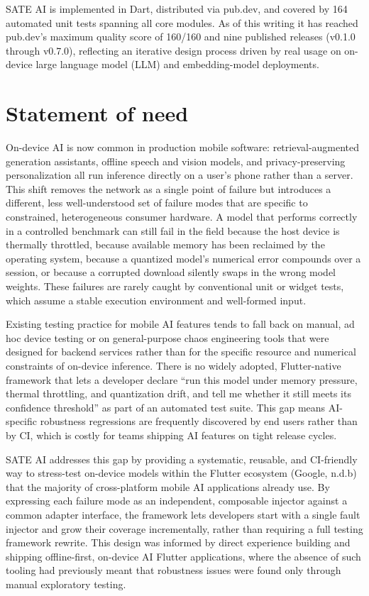 \documentclass[
  11pt,
]{article}
\begin{document}
SATE AI is implemented in Dart, distributed via pub.dev, and covered by
164 automated unit tests spanning all core modules. As of this writing
it has reached pub.dev's maximum quality score of 160/160 and nine
published releases (v0.1.0 through v0.7.0), reflecting an iterative
design process driven by real usage on on-device large language model
(LLM) and embedding-model deployments.

\hypertarget{statement-of-need}{%
\section{Statement of need}\label{statement-of-need}}

On-device AI is now common in production mobile software:
retrieval-augmented generation assistants, offline speech and vision
models, and privacy-preserving personalization all run inference
directly on a user's phone rather than a server. This shift removes the
network as a single point of failure but introduces a different, less
well-understood set of failure modes that are specific to constrained,
heterogeneous consumer hardware. A model that performs correctly in a
controlled benchmark can still fail in the field because the host device
is thermally throttled, because available memory has been reclaimed by
the operating system, because a quantized model's numerical error
compounds over a session, or because a corrupted download silently swaps
in the wrong model weights. These failures are rarely caught by
conventional unit or widget tests, which assume a stable execution
environment and well-formed input.

Existing testing practice for mobile AI features tends to fall back on
manual, ad hoc device testing or on general-purpose chaos engineering
tools that were designed for backend services rather than for the
specific resource and numerical constraints of on-device inference.
There is no widely adopted, Flutter-native framework that lets a
developer declare ``run this model under memory pressure, thermal
throttling, and quantization drift, and tell me whether it still meets
its confidence threshold'' as part of an automated test suite. This gap
means AI-specific robustness regressions are frequently discovered by
end users rather than by CI, which is costly for teams shipping AI
features on tight release cycles.

SATE AI addresses this gap by providing a systematic, reusable, and
CI-friendly way to stress-test on-device models within the Flutter
ecosystem (Google, n.d.b) that the majority of cross-platform mobile AI
applications already use. By expressing each failure mode as an
independent, composable injector against a common adapter interface, the
framework lets developers start with a single fault injector and grow
their coverage incrementally, rather than requiring a full testing
framework rewrite. This design was informed by direct experience
building and shipping offline-first, on-device AI Flutter applications,
where the absence of such tooling had previously meant that robustness
issues were found only through manual exploratory testing.
\end{document}
